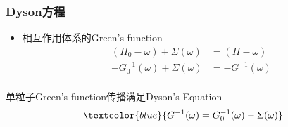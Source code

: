 {\frame
{
	\frametitle{\textrm{Dyson}方程}
	\begin{itemize}
		\item 相互作用体系的\textrm{Green's function}
\begin{displaymath}
	\begin{aligned}
		(H_0-\omega)+\Sigma(\omega)&=(H-\omega)\\
		-G_0^{-1}(\omega)+\Sigma(\omega)&=-G^{-1}(\omega)\\
	\end{aligned}
\end{displaymath}
	\end{itemize}
\begin{figure}[h!]
	\vspace{-5pt}
\centering
{}
\label{Multiple_scattering-0-9}
\end{figure}
	\vspace{-0.2in}
单粒子\textrm{Green's function}传播满足\textrm{Dyson's Equation}
\begin{displaymath}
	\textcolor{blue}{G^{-1}(\omega)=G_0^{-1}(\omega)-\Sigma(\omega)}
\end{displaymath}
}

}
